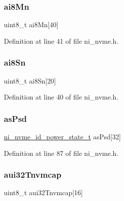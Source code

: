 \subsubsection{\texorpdfstring{ai8Mn}{ai8Mn}}
{\footnotesize\ttfamily uint8\+\_\+t ai8\+Mn\mbox{[}40\mbox{]}}



Definition at line 41 of file ni\+\_\+nvme.\+h.

\mbox{\label{struct__ni__nvme__identify_aba1fb10fa3fa0319a5668b1eb13561c0}} 
\subsubsection{\texorpdfstring{ai8Sn}{ai8Sn}}
{\footnotesize\ttfamily uint8\+\_\+t ai8\+Sn\mbox{[}20\mbox{]}}



Definition at line 40 of file ni\+\_\+nvme.\+h.

\mbox{\label{struct__ni__nvme__identify_a2a961bf31e58fec101465ba0034a7756}} 
\subsubsection{\texorpdfstring{asPsd}{asPsd}}
{\footnotesize\ttfamily \mbox{\hyperlink{ni__nvme_8h_a1a1a76137cfb375acef1331f45fb31e3}{ni\+\_\+nvme\+\_\+id\+\_\+power\+\_\+state\+\_\+t}} as\+Psd\mbox{[}32\mbox{]}}



Definition at line 87 of file ni\+\_\+nvme.\+h.

\mbox{\label{struct__ni__nvme__identify_a6ad5a3ac7a28dce6bffe036cc1e3b3e3}} 
\subsubsection{\texorpdfstring{aui32Tnvmcap}{aui32Tnvmcap}}
{\footnotesize\ttfamily uint8\+\_\+t aui32\+Tnvmcap\mbox{[}16\mbox{]}}



